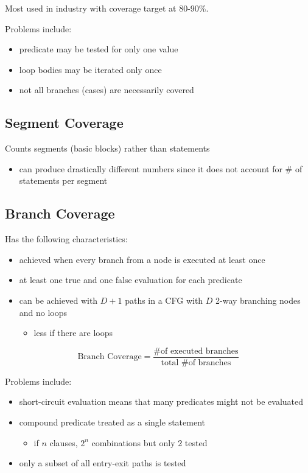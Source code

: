 \documentclass[11pt]{article}
\begin{document}
Most used in industry with coverage target at 80-90\%.

Problems include:
\begin{itemize}
\item predicate may be tested for only one value
\item loop bodies may be iterated only once
\item not all branches (cases) are necessarily covered
\end{itemize}
\subsection{Segment Coverage}
\label{sec:org54da7ba}
Counts segments (basic blocks) rather than statements
\begin{itemize}
\item can produce drastically different numbers since it does not account for \# of statements per segment
\end{itemize}
\subsection{Branch Coverage}
\label{sec:org992b2b0}
Has the following characteristics:
\begin{itemize}
\item achieved when every branch from a node is executed at least once
\item at least one true and one false evaluation for each predicate
\item can be achieved with \(D+1\) paths in a CFG with \(D\) 2-way branching nodes and no loops
\begin{itemize}
\item less if there are loops
\end{itemize}
\end{itemize}
$$
        \text{Branch Coverage} = \frac{\text{\# of executed branches}}{\text{total \# of branches}}
$$

Problems include:
\begin{itemize}
\item short-circuit evaluation means that many predicates might not be evaluated
\item compound predicate treated as a single statement
\begin{itemize}
\item if \(n\) clauses, \(2^{n}\) combinations but only 2 tested
\end{itemize}
\item only a subset of all entry-exit paths is tested
\end{itemize}
\end{document}
